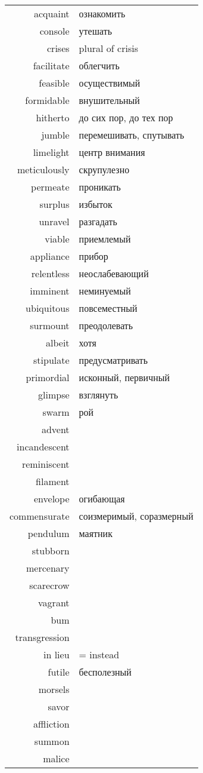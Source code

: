 \documentclass[a4paper, 12pt]{article}
\begin{document}
\begin{tabular}{rl}
	acquaint & ознакомить \\
	console & утешать \\
	crises & plural of crisis \\
	facilitate & облегчить \\
	feasible & осуществимый \\
	formidable & внушительный \\
	hitherto & до сих пор, до тех пор \\
	jumble & перемешивать, спутывать \\
	limelight & центр внимания \\
	meticulously & скрупулезно \\
	permeate & проникать \\
	surplus & избыток \\
	unravel & разгадать \\
	viable & приемлемый \\
	appliance & прибор \\
	relentless & неослабевающий \\
	imminent & неминуемый \\
	ubiquitous & повсеместный \\
	surmount & преодолевать \\
	albeit & хотя \\
	stipulate & предусматривать \\
	primordial & исконный, первичный \\
	glimpse & взглянуть \\
	swarm & рой \\
	advent & \\
	incandescent & \\
	reminiscent & \\
	filament & \\
	envelope & огибающая \\
	commensurate & соизмеримый, соразмерный \\
	pendulum & маятник \\
	stubborn & \\
	mercenary & \\
	scarecrow & \\
	vagrant & \\
	bum & \\
	transgression & \\
	in lieu & = instead \\
	futile & бесполезный \\
	morsels & \\
	savor & \\
	affliction & \\
	summon & \\
	malice & \\
\end{tabular}
\end{document}
